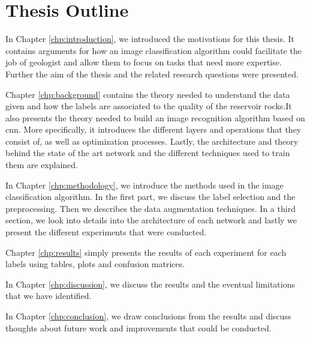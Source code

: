 \section{Thesis Outline}

In Chapter \ref{chp:introduction}, we introduced the motivations for this thesis. It contains arguments for how an image classification algorithm could facilitate the job of geologist and allow them to focus on tasks that need more expertise. Further the aim of the thesis and the related research questions were presented. 


Chapter \ref{chp:background} contains the theory needed to understand the data given and how the labels are associated to the quality of the reservoir rocks.It also presents the theory needed to build an image recognition algorithm based on \gls{cnn}. More specifically, it introduces the different layers and operations that they consist of, as well as optimization processes. Lastly, the architecture and theory behind the state of the art network and the different techniques used to train them are explained.
 

In Chapter \ref{chp:methodology}, we introduce the methods used in the image classification algorithm. In the first part, we discuss the label selection and the preprocessing. Then we describes the data augmentation techniques. In a third section, we look into details into the architecture of each network and lastly we present the different experiments that were conducted.  


Chapter \ref{chp:results} simply presents the results of each experiment for each labels using tables, plots and confusion matrices.


In Chapter \ref{chp:discussion}, we discuss the results and the eventual limitations that we have identified.


In Chapter \ref{chp:conclusion}, we draw conclusions from the results and discuss thoughts about future work and improvements that could be conducted. 
